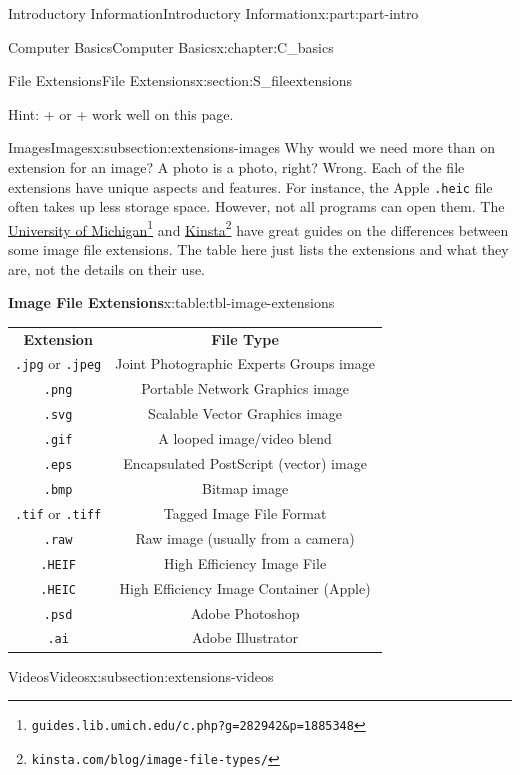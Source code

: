 \documentclass[oneside,10pt,]{book}
\newcommand{\tabularfont}{\relax}
\newcommand{\mono}[1]{\texttt{#1}}
\newcommand{\kbd}[1]{\keys{{#1}}}
\begin{document}
\begin{partptx}{Introductory Information}{}{Introductory Information}{}{}{x:part:part-intro}
\begin{chapterptx}{Computer Basics}{}{Computer Basics}{}{}{x:chapter:C_basics}
\begin{sectionptx}{File Extensions}{}{File Extensions}{}{}{x:section:S_fileextensions}
\begin{introduction}{}
\par
Hint: \kbd{Control} + \kbd{F} or \kbd{Command} + \kbd{F} work well on this page.%
\end{introduction}%
%
%
\typeout{************************************************}
\typeout{************************************************}
%
\begin{subsectionptx}{Images}{}{Images}{}{}{x:subsection:extensions-images}
%
Why would we need more than on extension for an image? A photo is a photo, right? Wrong. Each of the file extensions have unique aspects and features. For instance, the Apple \mono{.heic} file often takes up less storage space. However, not all programs can open them. The \href{https://guides.lib.umich.edu/c.php?g=282942\&p=1885348}{University of Michigan}\footnote{\nolinkurl{guides.lib.umich.edu/c.php?g=282942\&p=1885348}\label{g:fn:idp615253400}} and \href{https://kinsta.com/blog/image-file-types/}{Kinsta}\footnote{\nolinkurl{kinsta.com/blog/image-file-types/}\label{g:fn:idp615255064}} have great guides on the differences between some image file extensions. The table here just lists the extensions and what they are, not the details on their use.%
\begin{tableptx}{\textbf{Image File Extensions}}{x:table:tbl-image-extensions}{}%
\centering%
{\tabularfont%
\begin{tabular}{cc}
\textbf{Extension}&\textbf{File Type}\tabularnewline[0pt]
\mono{.jpg} or \mono{.jpeg}&Joint Photographic Experts Groups image\tabularnewline[0pt]
\mono{.png}&Portable Network Graphics image\tabularnewline[0pt]
\mono{.svg}&Scalable Vector Graphics image\tabularnewline[0pt]
\mono{.gif}&A looped image\slash{}video blend\tabularnewline[0pt]
\mono{.eps}&Encapsulated PostScript (vector) image\tabularnewline[0pt]
\mono{.bmp}&Bitmap image\tabularnewline[0pt]
\mono{.tif} or \mono{.tiff}&Tagged Image File Format\tabularnewline[0pt]
\mono{.raw}&Raw image (usually from a camera)\tabularnewline[0pt]
\mono{.HEIF}&High Efficiency Image File\tabularnewline[0pt]
\mono{.HEIC}&High Efficiency Image Container (Apple)\tabularnewline[0pt]
\mono{.psd}&Adobe Photoshop\tabularnewline[0pt]
\mono{.ai}&Adobe Illustrator
\end{tabular}
}%
\end{tableptx}%
\end{subsectionptx}
%
%
\typeout{************************************************}
\typeout{************************************************}
%
\begin{subsectionptx}{Videos}{}{Videos}{}{}{x:subsection:extensions-videos}

\end{subsectionptx}
\end{sectionptx}
\end{chapterptx}
\end{partptx}
\end{document}
